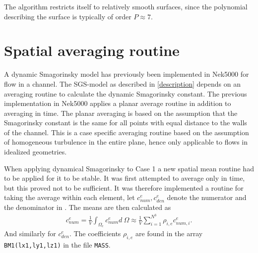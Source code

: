 %
The algorithm restricts itself to relatively smooth surfaces, since the polynomial 
describing the surface is typically of order $P \approx 7$.
%
\section{Spatial averaging routine}
A dynamic Smagorinsky model has previously been implemented in Nek5000 for flow in a channel. 
The SGS-model as described in \cref{description} depends on an averaging routine to calculate
the dynamic Smagorinsky constant. The previous implementation in Nek5000 applies a planar average routine
in addition to averaging in time. The planar averaging is based on the assumption that the Smagorinsky 
constant is the same for all points with equal distance to the walls of the channel.
This is a case specific averaging routine based on the assumption of homogeneous turbulence 
in the entire plane, hence only applicable to flows in idealized geometries.

When applying dynamical Smagorinsky to Case 1 a new spatial mean routine had to be applied for it to be stable. 
It was first attempted to average only in time, but this proved not to be sufficient. It was
therefore implemented a routine for taking the average within each element, let 
$c_{num}^e,c_{den}^e$ denote the numerator and the denominator in .
The means are then calculated as 
\begin{align}
    c_{num}^e = \frac{1}{V}\int_{\Omega_e}c_{num}^e d\: \Omega 
    \approx \frac{1}{V}\sum_{i = 1}^{N^3}\rho_{i,e}c_{num,i}^{e}.
    \label{eq:averageroutine}
\end{align}
And similarly for $c_{den}^e$.
The coefficients $\rho_{i,e}$ are found in the array \verb|BM1(lx1,ly1,lz1)| in the file 
\verb|MASS|.
